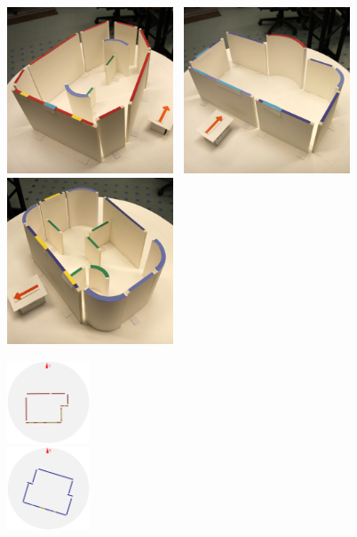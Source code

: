 \begin{figure}[t]
\begin{minipage}[b]{5.95in}
  \includegraphics[width=1.95in]{../gi2012_userstudy/images/photos/38_new_design}~ %
  \includegraphics[width=1.95in]{../gi2012_userstudy/images/photos/68_new_design}~ %
  \includegraphics[width=1.95in]{../gi2012_userstudy/images/photos/98_new_design}~ %
\end{minipage}
\hfill
\begin{minipage}[b]{1.0in}
  \includegraphics[width=0.97in]{../gi2012_userstudy/images/section4/0_2D_walls_rotate}\\ %
  \includegraphics[width=0.97in]{../gi2012_userstudy/images/section4/1_2D_walls_rotate} %
\end{minipage}


\end{figure}
